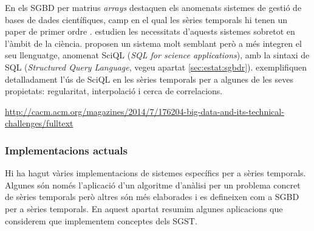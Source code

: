 En els SGBD per matrius \emph{arrays} destaquen els anomenats sistemes
de gestió de bases de dades científiques, camp en el qual les sèries
temporals hi tenen un paper de primer
ordre \parencite{zhang11}. \textcite{stonebraker09:scidb} estudien les
necessitats d'aquests sistemes sobretot en l'àmbit de la
ciència. \textcite{kersten11} proposen un sistema molt semblant però a
més integren el seu llenguatge, anomenat SciQL (\emph{SQL for
  science applications}), amb la sintaxi de SQL (\emph{Structured Query Language},
vegeu apartat \ref{sec:estat:sgbdr}). \textcite{zhang11} exemplifiquen
detalladament l'ús de SciQL en les sèries temporals per a algunes de
les seves propietats: regularitat, interpolació i cerca de
correlacions.





\url{http://cacm.acm.org/magazines/2014/7/176204-big-data-and-its-technical-challenges/fulltext}



\subsubsection{Implementacions actuals}

Hi ha hagut vàries implementacions de sistemes específics per a sèries
temporals. Algunes són només l'aplicació d'un algoritme d'anàlisi per
un problema concret de sèries temporals però altres són més elaborades
i es defineixen com a SGBD per a sèries temporals.  En aquest apartat
resumim algunes aplicacions que considerem que implementem conceptes
dels SGST.



